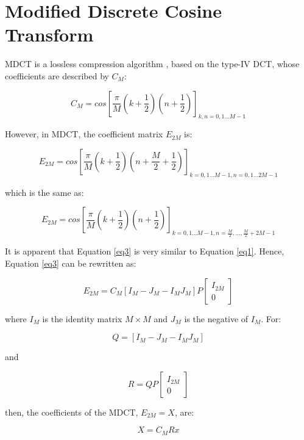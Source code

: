 \documentclass[conference]{IEEEtran}
\begin{document}
	\section{Modified Discrete Cosine Transform}
	
	MDCT is a lossless compression algorithm \cite{b1}, based on the type-IV DCT, whose coefficients are described by $C_M$:
	
	\begin{equation}
	C_M = cos[\frac{\pi}{M}(k + \frac{1}{2})(n + \frac{1}{2})]_{k,n=0,1...M-1}
	\label{eq1}
	\end{equation}
	
	However, in MDCT, the coefficient matrix $E_{2M}$ is:
	
	\begin{equation}
	E_{2M} = cos[\frac{\pi}{M}(k + \frac{1}{2})(n + \frac{M}{2} + \frac{1}{2})]_{k=0,1...M-1, n=0,1...2M-1}
	\label{eq2}
	\end{equation}
	
	which is the same as:
	
	\begin{equation}
	E_{2M} = cos[\frac{\pi}{M}(k + \frac{1}{2})(n + \frac{1}{2})]_{k=0,1...M-1, n=\frac{M}{2},...,\frac{M}{2}+2M-1}
	\label{eq3}
	\end{equation}
	
	It is apparent that Equation \ref{eq3} is very similar to Equation \ref{eq1}. Hence, Equation \ref{eq3} can be rewritten as:
	
	\begin{equation}
	E_{2M} = C_M[I_M -J_M -I_M J_M]P\left[\begin{matrix}I_{2M} \\ 0\end{matrix}\right]
	\label{eq4}
	\end{equation}
	
	where $I_{M}$ is the identity matrix $M\times M$ and $J_{M}$ is the negative of $I_M$. For:
	
	$$Q = [I_M -J_M -I_M J_M]$$
	
	and
	
	$$R = QP\left[\begin{matrix}I_{2M} \\ 0\end{matrix}\right]$$
	
	then, the coefficients of the MDCT, $E_{2M} = X$, are:
	
	\begin{equation}
	X = C_MRx
	\label{eq5}
	\end{equation}
	
\end{document}
